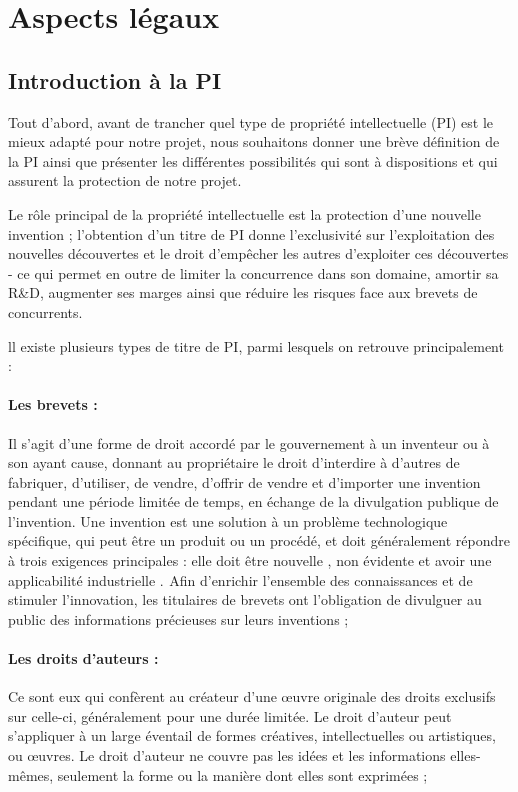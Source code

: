 \section{Aspects légaux}\label{section:aspects_legaux}

\subsection{Introduction à la PI}
Tout d’abord, avant de trancher quel type de propriété intellectuelle (PI) est le mieux adapté pour notre projet, nous souhaitons donner une brève définition de la PI ainsi que présenter les différentes possibilités qui sont à dispositions et qui assurent la protection de notre projet.\newline

Le rôle principal de la propriété intellectuelle est la protection d’une nouvelle invention ; l’obtention d’un titre de PI donne l’exclusivité sur l’exploitation des nouvelles  découvertes et le droit d'empêcher les autres d'exploiter ces découvertes - ce qui permet en outre de limiter la concurrence dans son domaine, amortir sa R&D, augmenter ses marges ainsi que réduire les risques face aux brevets de concurrents.\newline

ll existe plusieurs types de titre de PI, parmi lesquels on retrouve principalement :

\paragraph{Les brevets :}
Il s'agit d'une forme de droit accordé par le gouvernement à un inventeur ou à son ayant cause, donnant au propriétaire le droit d'interdire à d'autres de fabriquer, d'utiliser, de vendre, d'offrir de vendre et d'importer une invention pendant une période limitée de temps, en échange de la divulgation publique de l'invention. Une invention est une solution à un problème technologique spécifique, qui peut être un produit ou un procédé, et doit généralement répondre à trois exigences principales : elle doit être nouvelle , non évidente et avoir une applicabilité industrielle .  Afin d'enrichir l'ensemble des connaissances et de stimuler l'innovation, les titulaires de brevets ont l'obligation de divulguer au public des informations précieuses sur leurs inventions ;

\paragraph{Les droits d'auteurs :} 
Ce sont eux qui confèrent au créateur d'une œuvre originale des droits exclusifs sur celle-ci, généralement pour une durée limitée. Le droit d'auteur peut s'appliquer à un large éventail de formes créatives, intellectuelles ou artistiques, ou œuvres.  Le droit d'auteur ne couvre pas les idées et les informations elles-mêmes, seulement la forme ou la manière dont elles sont exprimées ;


